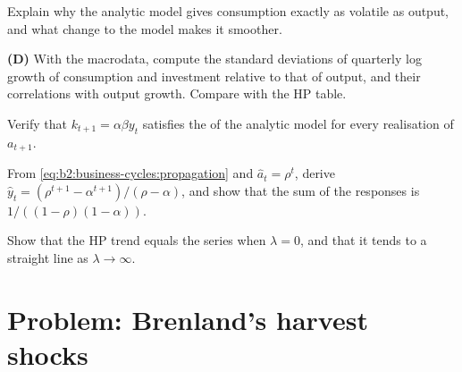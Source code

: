 \begin{exercise}[$\star\star$]\label{exo:b2:business-cycles:8}
Explain why the analytic model gives consumption exactly as volatile as output, and what change to the model makes it
smoother.
\end{exercise}

\begin{exercise}[$\star\star$]\label{exo:b2:business-cycles:9}
\textbf{(D)} With the macrodata, compute the standard deviations of quarterly log growth of consumption and investment relative to
that of output, and their correlations with output growth. Compare with the HP table.
\end{exercise}

\begin{exercise}[$\star\star\star$]\label{exo:b2:business-cycles:10}
Verify that $k_{t+1} = \alpha\beta y_t$ satisfies the  of the analytic model for every realisation of $a_{t+1}$.
\end{exercise}

\begin{exercise}[$\star\star\star$]\label{exo:b2:business-cycles:11}
From \eqref{eq:b2:business-cycles:propagation} and $\hat a_t = \rho^t$, derive $\hat y_t = (\rho^{t+1} - \alpha^{t+1})/(\rho - \alpha)$, and show that the sum of the responses is $1/((1 - \rho)(1 - \alpha))$.
\end{exercise}

\begin{exercise}[$\star\star\star$]\label{exo:b2:business-cycles:12}
Show that the HP trend equals the series when $\lambda = 0$, and that it tends to a straight line as $\lambda \to \infty$.
\end{exercise}

\section{Problem: Brenland's harvest shocks}\label{sec:b2:business-cycles:problem}

